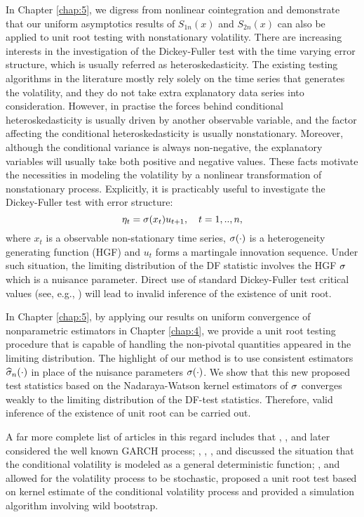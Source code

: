 In Chapter \ref{chap:5}, we digress from nonlinear cointegration and demonstrate that our uniform asymptotics results of $S_{1n}(x)$ and $S_{2n}(x)$ can also be applied to unit root testing with nonstationary volatility. There are increasing interests in the investigation of the Dickey-Fuller test with the time varying error structure, which is  usually referred as heteroskedasticity. The existing testing algorithms in the literature mostly rely solely on the  time series that generates the volatility, and they do not  take extra explanatory data series into consideration. However, in practise the forces behind conditional heteroskedasticity is usually driven by another observable variable, and the factor affecting the conditional heteroskedasticity is usually nonstationary. Moreover, although the conditional variance is always non-negative, the explanatory variables will usually take both positive and negative values. These facts motivate the necessities in  modeling the volatility by a nonlinear transformation of nonstationary process. Explicitly, it is practicably useful to investigate  the Dickey-Fuller test with  error structure:
\begin{equation} \la{eqn11}
\eta_{t} = \si (x_{t}) u_{t+1}, \quad t = 1,.., n,
\end{equation}
where $x_{t}$ is a observable  non-stationary time series, $\sigma(\cdot)$ is  a heterogeneity generating function (HGF) and $u_{t}$ forms a martingale innovation sequence. Under such situation, the limiting distribution of the DF statistic involves the HGF $\sigma$  which is a nuisance parameter. Direct use of standard Dickey-Fuller test critical values (see, e.g., \cite{fuller1996}) will lead to invalid inference of the existence of unit root.

In Chapter \ref{chap:5}, by applying our results on uniform convergence of nonparametric estimators in Chapter \ref{chap:4}, we provide a unit root testing procedure that is capable of handling the non-pivotal quantities appeared in the limiting distribution. The highlight of our method is to use  consistent estimators $\widehat{\sigma}_n(\cdot)$ in place of the nuisance parameters $\sigma(\cdot)$. We show that this new proposed test statistics based on the Nadaraya-Watson kernel estimators of $\sigma$ converges weakly to the limiting distribution of the DF-test statistics. Therefore, valid inference of the existence of unit root can be carried out.

A far more complete list of articles in this regard includes that \cite{kimschmidt1993}, \cite{hansenrahbek1998},  \cite{boswijk2001} and later \cite{linglimcaleer2003} considered   the well known GARCH process; \cite{hamoritokihisa1997}, \cite{kimleybournenewbold2002}, \cite{cavaliere2005}, \cite{cavalieretaylor2008a} and \cite{beare2008} discussed  the situation that the conditional volatility is modeled as a general deterministic function; \cite{boswijk2005},  \cite{xu2008} and  \citet[][\citeyear{cavalieretaylor2008b}, \citeyear{cavalieretaylor2009}]{cavalieretaylor2007} allowed for the volatility process to be stochastic, proposed a unit root test based on kernel estimate of the conditional volatility process and provided a simulation algorithm involving wild bootstrap.


